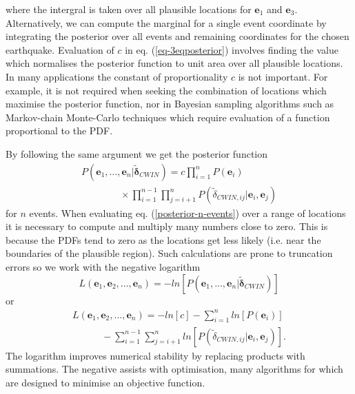 \documentclass[extra]{gji}
\begin{document}
where the intergral is taken over all plausible locations for $\mathbf{e}_1$ and $\mathbf{e}_3$.
Alternatively, we can compute the marginal for a single event coordinate
by integrating the posterior over all events and remaining coordinates
for the chosen earthquake. Evaluation of $c$ in eq. (\ref{eq-3eqposterior}) involves finding the value which
normalises the posterior function to unit area over all plausible locations.
In many applications the constant of
proportionality $c$ is not important. For example, it is not required
when seeking the combination of locations which maximise
 the posterior function, nor in Bayesian sampling algorithms such as Markov-chain Monte-Carlo
techniques which require evaluation of a function proportional to the PDF.

By following the same argument we get the posterior function
\begin{equation}
\begin{array}{l}
\label{posterior-n-events}
P(\mathbf{e}_1,...,\mathbf{e}_n | \widetilde{\mathbf{\delta}}_{CWIN}) = c \displaystyle \prod_{i=1}^n P(\mathbf{e}_i) \\
\hspace{4em} \displaystyle  \times \prod_{i=1}^{n-1} \prod_{j=i+1}^n P(\widetilde{\delta}_{CWIN,ij}|\mathbf{e}_i,\mathbf{e}_j)
\end{array}
\end{equation}
for $n$ events. When evaluating eq. (\ref{posterior-n-events}) over a range of locations
it is necessary to compute and multiply many numbers close to zero.
This is because the PDFs tend to zero as
the locations get less likely (i.e. near the boundaries of the plausible region).
Such calculations are prone to truncation errors so we
work with the negative logarithm
\begin{equation}
\label{eq:-negative-log-part1}
L(\mathbf{e}_1, \mathbf{e}_2, ..., \mathbf{e}_n) = -ln\left[ P(\mathbf{e}_1,...,\mathbf{e}_n | \widetilde{\mathbf{\delta}}_{CWIN} )  \right]
\end{equation}
or
\begin{equation}
\begin{array}{l}
\label{eq:-negative-log}
L(\mathbf{e}_1, \mathbf{e}_2, ..., \mathbf{e}_n) =
-ln\left[ c \right] - \displaystyle \sum_{i=1}^n ln\left[P(\mathbf{e}_i)\right] \\
\hspace{3em} - \displaystyle \sum_{i=1}^{n-1} \sum_{j=i+1}^n ln\left[P(\widetilde{\delta}_{CWIN,ij}|\mathbf{e}_i,\mathbf{e}_j)\right].
\end{array}
\end{equation}
The logarithm improves numerical stability by replacing products with summations. The negative assists with
optimisation, many algorithms for which are designed to minimise an objective function.
\end{document}
